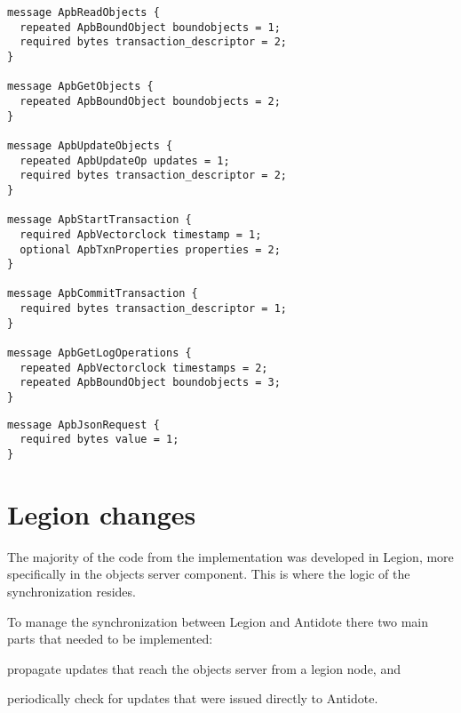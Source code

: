 \begin{lstlisting}[caption={Protocol Buffer interface methods before},label={lst:proto1}]
message ApbReadObjects {
  repeated ApbBoundObject boundobjects = 1;
  required bytes transaction_descriptor = 2;
}

message ApbGetObjects {
  repeated ApbBoundObject boundobjects = 2;
}

message ApbUpdateObjects {
  repeated ApbUpdateOp updates = 1;
  required bytes transaction_descriptor = 2;
}

message ApbStartTransaction {
  required ApbVectorclock timestamp = 1;
  optional ApbTxnProperties properties = 2;
}

message ApbCommitTransaction {
  required bytes transaction_descriptor = 1;
}

message ApbGetLogOperations {
  repeated ApbVectorclock timestamps = 2;
  repeated ApbBoundObject boundobjects = 3;
}
\end{lstlisting}

\begin{lstlisting}[caption={Protocol Buffer interface methods after},label={lst:proto2}]
message ApbJsonRequest {
  required bytes value = 1;
}
\end{lstlisting}

\section{Legion changes}
\label{sec:legion_changes}
The majority of the code from the implementation was developed in Legion, more specifically in the objects server component. This is where the logic of the synchronization resides.\par
	To manage the synchronization between Legion and Antidote there two main parts that needed to be implemented: 
\begin{enumerate*}[(i)]
\item propagate updates that reach the objects server from a legion node, and 
\item periodically check for updates that were issued directly to Antidote.
\end{enumerate*}

